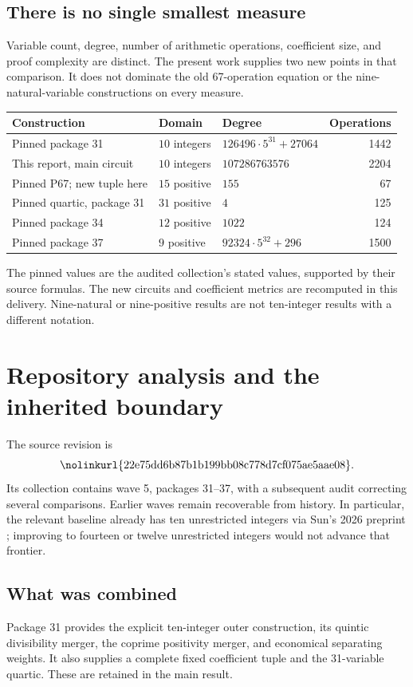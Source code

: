 \documentclass[11pt,a4paper]{article}
\theoremstyle{definition}
\newcommand{\code}[1]{\ifmmode\text{\nolinkurl{#1}}\else\nolinkurl{#1}\fi}
\begin{document}
\subsection{There is no single smallest measure}
Variable count, degree, number of arithmetic operations, coefficient
size, and proof complexity are distinct. The present work supplies
two new points in that comparison. It does not dominate the old
67-operation equation or the nine-natural-variable constructions
on every measure.

\begin{center}
\small
\begin{tabular}{@{}p{44mm}p{23mm}p{43mm}r@{}}
\toprule
Construction & Domain & Degree & Operations\\
\midrule
Pinned package 31 & $10$ integers &
$126496\cdot5^{31}+27064$ & 1442\\
This report, main circuit & $10$ integers &
$107286763576$ & 2204\\
Pinned P67; new tuple here & $15$ positive &
$155$ & 67\\
Pinned quartic, package 31 & $31$ positive &
$4$ & 125\\
Pinned package 34 & $12$ positive &
$1022$ & 124\\
Pinned package 37 & $9$ positive &
$92324\cdot5^{32}+296$ & 1500\\
\bottomrule
\end{tabular}
\end{center}
The pinned values are the audited collection's stated values,
supported by their source formulas. The new circuits and
coefficient metrics are recomputed in this delivery.
Nine-natural or nine-positive results are not ten-integer results
with a different notation.

\section{Repository analysis and the inherited boundary}
\label{sec:repo}
The source revision is
\[
 \code{22e75dd6b87b1b199bb08c778d7cf075ae5aae08}.
\]
Its collection contains wave 5, packages 31--37, with a subsequent
audit correcting several comparisons. Earlier waves remain
recoverable from history. In particular, the relevant baseline
already has ten unrestricted integers via Sun's 2026 preprint
\cite{Sun2026}; improving to fourteen or twelve unrestricted
integers would not advance that frontier.

\subsection{What was combined}
Package 31 provides the explicit ten-integer outer construction,
its quintic divisibility merger, the coprime positivity merger,
and economical separating weights. It also supplies a complete
fixed coefficient tuple and the 31-variable quartic. These are
retained in the main result.
\end{document}
